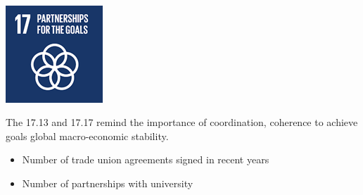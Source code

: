 \\
\begin{minipage}[c]{0.2\textwidth}
    \includegraphics[width=\textwidth]{Images/Social_sustainability/17_partnerships.png}
\end{minipage}
\begin{minipage}[c]{0.8\textwidth}
The 17.13 and 17.17 remind the importance of coordination, coherence to achieve goals global macro-economic stability. 
\begin{itemize}
    \item Number of trade union agreements signed in recent years
    \item Number of partnerships with university
\end{itemize}
\end{minipage}